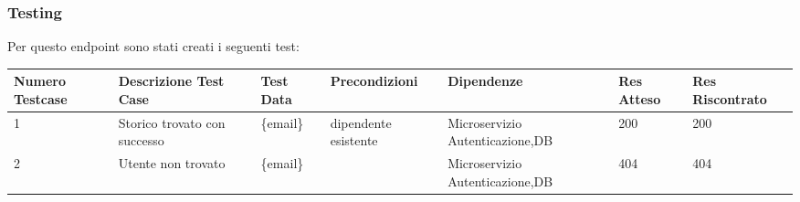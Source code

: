 \documentclass{report}
\begin{document}
\subsubsection*{Testing}
Per questo endpoint sono stati creati i seguenti test:
\begin{center} %
	\centering
	\begin{tabular}{ |p{1cm}|p{2cm}|p{2cm}|p{2cm}|p{2cm}|p{1cm}|p{1cm}| }
		\hline
		Numero Testcase & Descrizione Test Case & Test Data                   & Precondizioni                                          & Dipendenze & Res Atteso & Res Riscontrato \\
		\hline
		1               & Storico trovato con successo   & \{email\}  & dipendente esistente &  Microservizio Autenticazione,DB         & 200        & 200             \\
		\hline
		2               & Utente non trovato   & \{email\}  &  &  Microservizio Autenticazione,DB         & 404        & 404         \\
		\hline
		
	\end{tabular}
\end{center}
\end{document}
